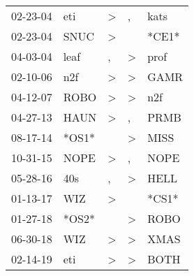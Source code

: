 \begin{supertabular}{lllll}
 02-23-04 &    eti &  \textgreater &             , &   kats \\
 02-23-04 &   SNUC &  \textgreater &               &  *CE1* \\
 04-03-04 &   leaf &             , &  \textgreater &   prof \\
 02-10-06 &    n2f &  \textgreater &  \textgreater &   GAMR \\
 04-12-07 &   ROBO &  \textgreater &  \textgreater &    n2f \\
 04-27-13 &   HAUN &  \textgreater &             , &   PRMB \\
 08-17-14 &  *OS1* &               &  \textgreater &   MISS \\
 10-31-15 &   NOPE &  \textgreater &             , &   NOPE \\
 05-28-16 &    40s &             , &  \textgreater &   HELL \\
 01-13-17 &    WIZ &  \textgreater &               &  *CS1* \\
 01-27-18 &  *OS2* &               &  \textgreater &   ROBO \\
 06-30-18 &    WIZ &  \textgreater &  \textgreater &   XMAS \\
 02-14-19 &    eti &  \textgreater &  \textgreater &   BOTH \\
\end{supertabular}
